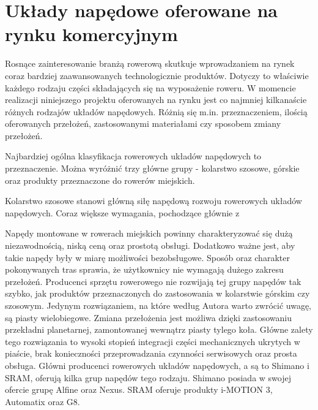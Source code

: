 \section{Układy napędowe oferowane na rynku komercyjnym}

Rosnące zainteresowanie branżą rowerową skutkuje wprowadzaniem na rynek coraz bardziej zaawansowanych technologicznie produktów. Dotyczy to właściwie każdego rodzaju części składających się na wyposażenie roweru. W momencie realizacji niniejszego projektu oferowanych na rynku jest co najmniej kilkanaście różnych rodzajów układów napędowych. Różnią się m.in. przeznaczeniem, ilością oferowanych przełożeń, zastosowanymi materiałami czy sposobem zmiany przełożeń.

Najbardziej ogólna klasyfikacja rowerowych układów napędowych to przeznaczenie. Można wyróżnić trzy główne grupy - kolarstwo szosowe, górskie oraz produkty przeznaczone do rowerów miejskich.

Kolarstwo szosowe stanowi główną siłę napędową rozwoju rowerowych układów napędowych. Coraz większe wymagania, pochodzące głównie z 
 
Napędy montowane w rowerach miejskich powinny charakteryzować się dużą niezawodnością, niską ceną oraz prostotą obsługi. Dodatkowo ważne jest, aby takie napędy były w miarę możliwości bezobsługowe. Sposób oraz charakter pokonywanych tras sprawia, że użytkownicy nie wymagają dużego zakresu przełożeń. Producenci sprzętu rowerowego nie rozwijają tej grupy napędów tak szybko, jak produktów przeznaczonych do zastosowania w kolarstwie górskim czy szosowym. Jedynym rozwiązaniem, na które według Autora warto zwrócić uwagę, są piasty wielobiegowe. Zmiana przełożenia jest możliwa dzięki zastosowaniu przekładni planetarnej, zamontowanej wewnątrz piasty tylego koła. Główne zalety tego rozwiązania to wysoki stopień integracji części mechanicznych ukrytych w piaście, brak konieczności przeprowadzania czynności serwisowych oraz prosta obsługa. Główni producenci rowerowych układów napędowych, a są to Shimano i SRAM, oferują kilka grup napędów tego rodzaju. Shimano posiada w swojej ofercie grupę Alfine oraz Nexus. SRAM oferuje produkty i-MOTION 3, Automatix oraz G8. 

   

